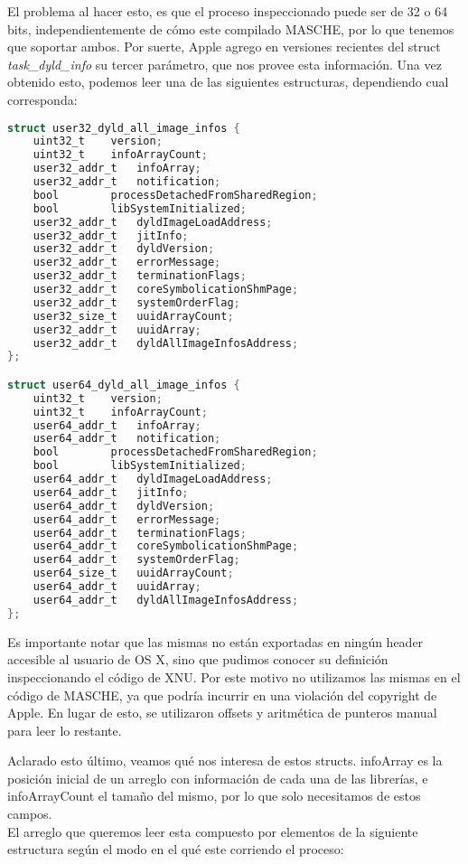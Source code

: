 El problema al hacer esto, es que el proceso inspeccionado puede ser de 32 o 64
bits, independientemente de cómo este compilado MASCHE, por lo que tenemos que
soportar ambos. Por suerte, Apple agrego en versiones recientes del struct
\textit{task\_dyld\_info} su tercer parámetro, que nos provee esta información.
Una vez obtenido esto, podemos leer una de las siguientes estructuras,
dependiendo cual corresponda:

\begin{lstlisting}[language=C]
struct user32_dyld_all_image_infos {
	uint32_t	version;
	uint32_t	infoArrayCount;
	user32_addr_t	infoArray;
	user32_addr_t	notification;
	bool		processDetachedFromSharedRegion;
	bool		libSystemInitialized;
	user32_addr_t	dyldImageLoadAddress;
	user32_addr_t	jitInfo;
	user32_addr_t	dyldVersion;
	user32_addr_t	errorMessage;
	user32_addr_t	terminationFlags;
	user32_addr_t	coreSymbolicationShmPage;
	user32_addr_t	systemOrderFlag;
	user32_size_t	uuidArrayCount;
	user32_addr_t	uuidArray;
	user32_addr_t	dyldAllImageInfosAddress;
};

struct user64_dyld_all_image_infos {
	uint32_t	version;
	uint32_t	infoArrayCount;
	user64_addr_t	infoArray;
	user64_addr_t	notification;
	bool		processDetachedFromSharedRegion;
	bool		libSystemInitialized;
	user64_addr_t	dyldImageLoadAddress;
	user64_addr_t	jitInfo;
	user64_addr_t	dyldVersion;
	user64_addr_t	errorMessage;
	user64_addr_t	terminationFlags;
	user64_addr_t	coreSymbolicationShmPage;
	user64_addr_t	systemOrderFlag;
	user64_size_t	uuidArrayCount;
	user64_addr_t	uuidArray;
	user64_addr_t	dyldAllImageInfosAddress;
};
\end{lstlisting}

\noindent Es importante notar que las mismas no están exportadas en ningún
header accesible al usuario de OS X, sino que pudimos conocer su definición
inspeccionando el código de XNU. Por este motivo no utilizamos las mismas en el
código de MASCHE, ya que podría incurrir en una violación del copyright de
Apple. En lugar de esto, se utilizaron offsets y aritmética de punteros manual
para leer lo restante.

Aclarado esto último, veamos qué nos interesa de estos structs. infoArray es la
posición inicial de un arreglo con información de cada una de las librerías, e
infoArrayCount el tamaño del mismo, por lo que solo necesitamos de estos
campos.\\

El arreglo que queremos leer esta compuesto por elementos de la siguiente
estructura según el modo en el qué este corriendo el proceso:

